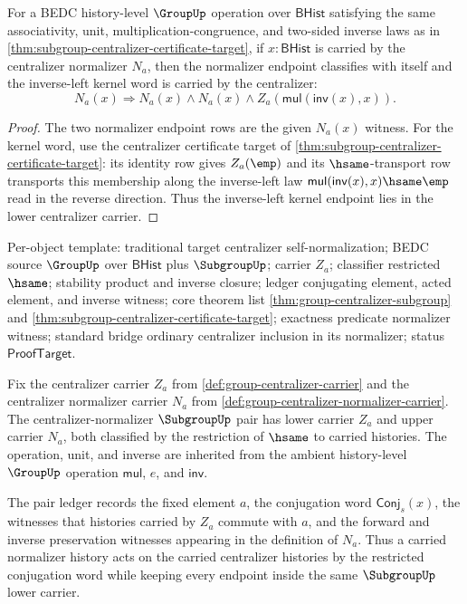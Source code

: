 \begin{lemma}
\label{lem:subgroup-centralizer-normalizer-kernel-classifier-refl}
For a BEDC history-level $\GroupUp$ operation over $\mathsf{BHist}$ satisfying
the same associativity, unit, multiplication-congruence, and two-sided inverse
laws as in \autoref{thm:subgroup-centralizer-certificate-target}, if
$x:\mathsf{BHist}$ is carried by the centralizer normalizer $N_a$, then the
normalizer endpoint classifies with itself and the inverse-left kernel word is
carried by the centralizer:
$$
N_a(x)\Rightarrow N_a(x)\land N_a(x)\land
Z_a(\mathsf{mul}(\mathsf{inv}(x),x)).
$$
\end{lemma}
\begin{proof}
The two normalizer endpoint rows are the given $N_a(x)$ witness. For the
kernel word, use the centralizer certificate target of
\autoref{thm:subgroup-centralizer-certificate-target}: its identity row gives
$Z_a(\emp)$ and its $\hsame$-transport row transports this membership along
the inverse-left law
$\mathsf{mul}(\mathsf{inv}(x),x)\hsame\emp$ read in the reverse direction.
Thus the inverse-left kernel endpoint lies in the lower centralizer carrier.
\end{proof}

Per-object template: traditional target centralizer self-normalization; BEDC
source $\GroupUp$ over $\mathsf{BHist}$ plus $\SubgroupUp$; carrier $Z_a$;
classifier restricted $\hsame$; stability product and inverse closure; ledger
conjugating element, acted element, and inverse witness; core theorem list
\autoref{thm:group-centralizer-subgroup} and
\autoref{thm:subgroup-centralizer-certificate-target}; exactness predicate
normalizer witness; standard bridge ordinary centralizer inclusion in its
normalizer; status $\mathsf{ProofTarget}$.

\begin{definition}
\label{def:subgroup-centralizer-normalizer-pair}
Fix the centralizer carrier $Z_a$ from
\autoref{def:group-centralizer-carrier} and the centralizer normalizer carrier
$N_a$ from \autoref{def:group-centralizer-normalizer-carrier}. The
centralizer-normalizer $\SubgroupUp$ pair has lower carrier $Z_a$ and upper
carrier $N_a$, both classified by the restriction of $\hsame$ to carried
histories. The operation, unit, and inverse are inherited from the ambient
history-level $\GroupUp$ operation $\mathsf{mul}$, $e$, and $\mathsf{inv}$.

The pair ledger records the fixed element $a$, the conjugation word
$\mathsf{Conj}_s(x)$, the witnesses that histories carried by $Z_a$ commute
with $a$, and the forward and inverse preservation witnesses appearing in the
definition of $N_a$. Thus a carried normalizer history acts on the carried
centralizer histories by the restricted conjugation word while keeping every
endpoint inside the same $\SubgroupUp$ lower carrier.
\end{definition}

